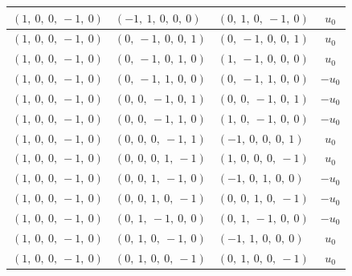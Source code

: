\documentclass[11pt]{article}
\theoremstyle{definition}
\begin{document}
\begin{longtable}{|l|l|l|c|}
    \hline
    $\left( 1, \  0, \  0, \  -1, \  0\right)$ & $\left( -1, \  1, \  0, \  0, \  0\right)$ & $\left( 0, \  1, \  0, \  -1, \  0\right)$ & $u_{0}$ \\
    \hline
    $\left( 1, \  0, \  0, \  -1, \  0\right)$ & $\left( 0, \  -1, \  0, \  0, \  1\right)$ & $\left( 0, \  -1, \  0, \  0, \  1\right)$ & $u_{0}$ \\
    \hline
    $\left( 1, \  0, \  0, \  -1, \  0\right)$ & $\left( 0, \  -1, \  0, \  1, \  0\right)$ & $\left( 1, \  -1, \  0, \  0, \  0\right)$ & $u_{0}$ \\
    \hline
    $\left( 1, \  0, \  0, \  -1, \  0\right)$ & $\left( 0, \  -1, \  1, \  0, \  0\right)$ & $\left( 0, \  -1, \  1, \  0, \  0\right)$ & $- u_{0}$ \\
    \hline
    $\left( 1, \  0, \  0, \  -1, \  0\right)$ & $\left( 0, \  0, \  -1, \  0, \  1\right)$ & $\left( 0, \  0, \  -1, \  0, \  1\right)$ & $- u_{0}$ \\
    \hline
    $\left( 1, \  0, \  0, \  -1, \  0\right)$ & $\left( 0, \  0, \  -1, \  1, \  0\right)$ & $\left( 1, \  0, \  -1, \  0, \  0\right)$ & $- u_{0}$ \\
    \hline
    $\left( 1, \  0, \  0, \  -1, \  0\right)$ & $\left( 0, \  0, \  0, \  -1, \  1\right)$ & $\left( -1, \  0, \  0, \  0, \  1\right)$ & $u_{0}$ \\
    \hline
    $\left( 1, \  0, \  0, \  -1, \  0\right)$ & $\left( 0, \  0, \  0, \  1, \  -1\right)$ & $\left( 1, \  0, \  0, \  0, \  -1\right)$ & $u_{0}$ \\
    \hline
    $\left( 1, \  0, \  0, \  -1, \  0\right)$ & $\left( 0, \  0, \  1, \  -1, \  0\right)$ & $\left( -1, \  0, \  1, \  0, \  0\right)$ & $- u_{0}$ \\
    \hline
    $\left( 1, \  0, \  0, \  -1, \  0\right)$ & $\left( 0, \  0, \  1, \  0, \  -1\right)$ & $\left( 0, \  0, \  1, \  0, \  -1\right)$ & $- u_{0}$ \\
    \hline
    $\left( 1, \  0, \  0, \  -1, \  0\right)$ & $\left( 0, \  1, \  -1, \  0, \  0\right)$ & $\left( 0, \  1, \  -1, \  0, \  0\right)$ & $- u_{0}$ \\
    \hline
    $\left( 1, \  0, \  0, \  -1, \  0\right)$ & $\left( 0, \  1, \  0, \  -1, \  0\right)$ & $\left( -1, \  1, \  0, \  0, \  0\right)$ & $u_{0}$ \\
    \hline
    $\left( 1, \  0, \  0, \  -1, \  0\right)$ & $\left( 0, \  1, \  0, \  0, \  -1\right)$ & $\left( 0, \  1, \  0, \  0, \  -1\right)$ & $u_{0}$ \\

\end{longtable}
\end{document}
